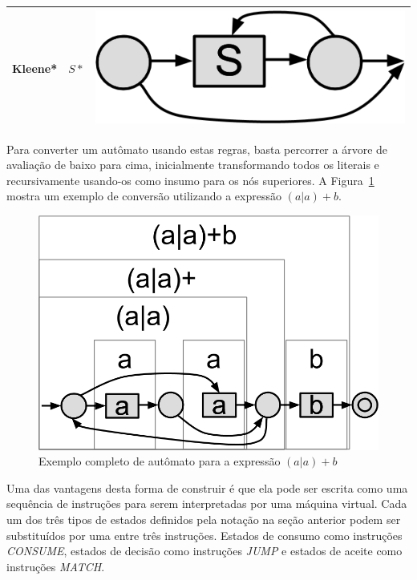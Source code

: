 \documentclass[a4paper,12pt,oneside,onecolumn]{uerj}
\begin{document}
\begin{center}
\begin{tabular}{ c | c | c }
		\hline
		Kleene* & $S*$ & \includegraphics[scale=0.25]{figures/thompson_kleene.png} \\ 
		\hline
	\end{tabular}
\end{center}

Para converter um autômato usando estas regras, basta percorrer a árvore de avaliação de baixo para cima, inicialmente transformando todos os literais e recursivamente usando-os como insumo para os nós superiores. A Figura~\ref{fig:exemplo_automato_completo} mostra um exemplo de conversão utilizando a expressão $(a|a)+b$.

\begin{figure}[!htbp]
  \centering
  \includegraphics[scale=0.33]{figures/exemplo_automato_completo.png}
  \caption{Exemplo completo de autômato para a expressão $(a|a)+b$}
  \label{fig:exemplo_automato_completo}
\end{figure}

Uma das vantagens desta forma de construir é que ela pode ser escrita como uma sequência de instruções para serem interpretadas por uma máquina virtual. Cada um dos três tipos de estados definidos pela notação na seção anterior podem ser substituídos por uma entre três instruções. Estados de consumo como instruções \emph{CONSUME}, estados de decisão como instruções \emph{JUMP} e estados de aceite como instruções \emph{MATCH}.
\end{document}
